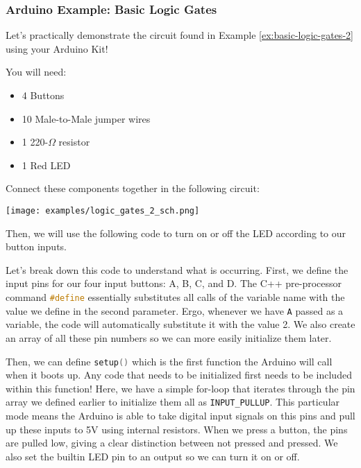     \pagebreak

    \subsubsection*{Arduino Example: Basic Logic Gates}
        Let's practically demonstrate the circuit found in Example \ref{ex:basic-logic-gates-2} using your Arduino Kit!
        
        You will need:
        \begin{itemize}
            \item 4 Buttons
            \item 10 Male-to-Male jumper wires
            \item 1 220-$\Omega$ resistor
            \item 1 Red LED
        \end{itemize}

        Connect these components together in the following circuit:
        \begin{center}
            \texttt{[image: examples/logic\_gates\_2\_sch.png]}
        \end{center}

        Then, we will use the following code to turn on or off the LED according to our button inputs.

        

        Let's break down this code to understand what is occurring.
        First, we define the input pins for our four input buttons: A, B, C, and D.
        The C++ pre-processor command \lstinline[language=C++]{#define} essentially substitutes all calls of the variable name with the value we define in the second parameter.
        Ergo, whenever we have \lstinline[language=C++]{A} passed as a variable, the code will automatically substitute it with the value 2.
        We also create an array of all these pin numbers so we can more easily initialize them later.

        

        Then, we can define \lstinline[language=C++]{setup()} which is the first function the Arduino will call when it boots up.
        Any code that needs to be initialized first needs to be included within this function!
        Here, we have a simple for-loop that iterates through the pin array we defined earlier to initialize them all as \lstinline[language=C++]{INPUT_PULLUP}.
        This particular mode means the Arduino is able to take digital input signals on this pins and pull up these inputs to 5V using internal resistors.
        When we press a button, the pins are pulled low, giving a clear distinction between not pressed and pressed.
        We also set the builtin LED pin to an output so we can turn it on or off.

